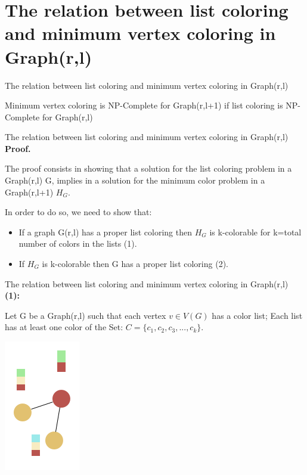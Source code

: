 \documentclass[9pt, compress]{beamer}
\begin{document}
    \section{The relation between list coloring and minimum vertex coloring in Graph(r,l)}
    \begin{frame}{The relation between list coloring and minimum vertex coloring in Graph(r,l)}
        \begin{theorem}
          Minimum vertex coloring is NP-Complete for Graph(r,l+1) if list coloring is NP-Complete for Graph(r,l)
        \end{theorem}
    \end{frame}
    \begin{frame}{The relation between list coloring and minimum vertex coloring in Graph(r,l)}
        \textbf{Proof.}
        
        The proof consists in showing that a solution for the list coloring problem in a Graph(r,l) G, implies in a solution for the minimum color problem in a Graph(r,l+1) $H_G$.
        
        In order to do so, we need to show that:
          \begin{itemize}
        \item If a graph G(r,l) has a proper list coloring then $H_G$ is k-colorable for k=total number of colors in the lists (1).
        \item If $H_G$ is k-colorable then G has a proper list coloring (2).
      \end{itemize}
    \end{frame}
    \begin{frame}{The relation between list coloring and minimum vertex coloring in Graph(r,l)}
      \textbf{(1):}
      
      Let G be a Graph(r,l) such that each vertex $v \in V(G)$ has a color list; 
      Each list has at least one color of the Set: $C = \{c_1,c_2,c_3,...,c_k \}$. 
      \begin{center}
        \includegraphics[scale=0.4]{../figuras/presentation-G.png}
      \end{center}
    \end{frame}
\end{document}
